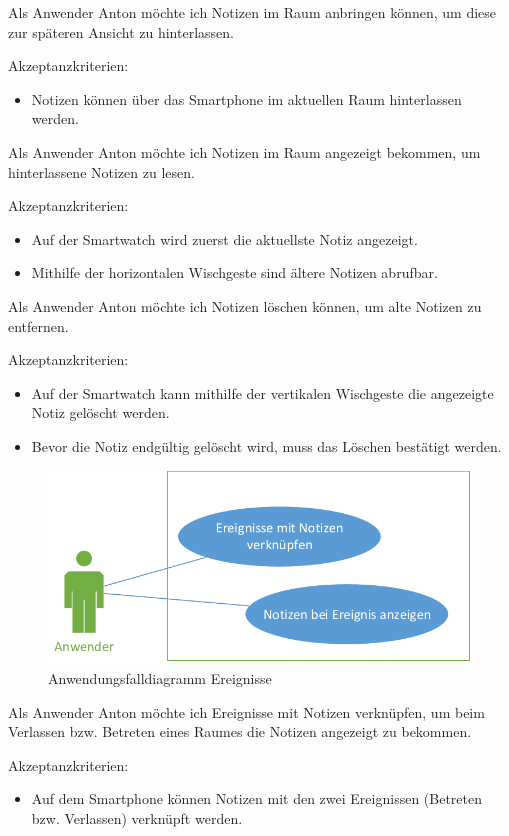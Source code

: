Als Anwender Anton möchte ich Notizen im Raum anbringen können, um diese zur späteren Ansicht zu hinterlassen.

Akzeptanzkriterien:
\begin{itemize}
\item Notizen können über das Smartphone im aktuellen Raum hinterlassen werden.
\end{itemize}

Als Anwender Anton möchte ich Notizen im Raum angezeigt bekommen, um hinterlassene Notizen zu lesen.

Akzeptanzkriterien:
\begin{itemize}
\item Auf der Smartwatch wird zuerst die aktuellste Notiz angezeigt.
\item Mithilfe der horizontalen Wischgeste sind ältere Notizen abrufbar.
\end{itemize}

Als Anwender Anton möchte ich Notizen löschen können, um alte Notizen zu entfernen.

Akzeptanzkriterien:
\begin{itemize}
\item Auf der Smartwatch kann mithilfe der vertikalen Wischgeste die angezeigte Notiz gelöscht werden.
\item Bevor die Notiz endgültig gelöscht wird, muss das Löschen bestätigt werden.
\end{itemize}


\begin{figure}[H]
\centering
\includegraphics[width=0.7\linewidth]{Bilder/UseCase-Ereignisse}
\caption{Anwendungsfalldiagramm Ereignisse}
\label{fig:UseCase-Ereignisse}
\end{figure}

Als Anwender Anton möchte ich Ereignisse mit Notizen verknüpfen, um beim Verlassen bzw. Betreten eines Raumes die Notizen angezeigt zu bekommen.

Akzeptanzkriterien:
\begin{itemize}
\item Auf dem Smartphone können Notizen mit den zwei Ereignissen (Betreten bzw. Verlassen) verknüpft werden.
\end{itemize}

